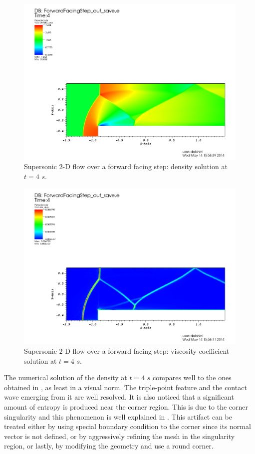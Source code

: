\begin{figure}[H]
\centering
\includegraphics[width=\textwidth]{figures/FFSDensityEqualTo4.png}
\caption{Supersonic $2$-D flow over a forward facing step: density solution at $t=4$ $s$.}
\label{fig:2d_ffs_rho_4}
\end{figure}
%
\begin{figure}[H]
\centering
\includegraphics[width=\textwidth]{figures/FFSViscEqualTo4.png}
\caption{Supersonic $2$-D flow over a forward facing step: viscosity coefficient solution at $t=4$ $s$.}
\label{fig:2d_ffs_visc_4}
\end{figure}
%
The numerical solution of the density at $t=4$ $s$ compares well to the ones obtained in \cite{valentin}, as least in a visual norm. The triple-point feature and the contact wave emerging from it are well resolved. It is also noticed that a significant amount of entropy is produced near the corner region. This is due to the corner singularity and this phenomenon is well explained in \cite{FFS_corner}. This artifact can be treated either by using special boundary condition to the corner since its normal vector is not defined, or by aggressively refining the mesh in the singularity region, or lastly, by modifying the geometry and use a round corner. 
